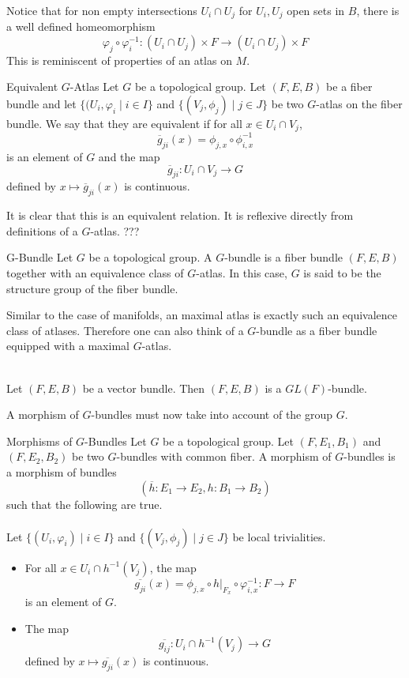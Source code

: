 \documentclass[a4paper]{article}
\begin{document}
Notice that for non empty intersections $U_i\cap U_j$ for $U_i,U_j$ open sets in $B$, there is a well defined homeomorphism $$\varphi_j\circ\varphi_i^{-1}:(U_i\cap U_j)\times F\to(U_i\cap U_j)\times F$$ This is reminiscent of properties of an atlas on $M$. \\

\begin{defn}{Equivalent $G$-Atlas}{} Let $G$ be a topological group. Let $(F,E,B)$ be a fiber bundle and let $\{(U_i,\varphi_i\;|\;i\in I\}$ and $\{(V_j,\phi_j)\;|\;j\in J\}$ be two $G$-atlas on the fiber bundle. We say that they are equivalent if for all $x\in U_i\cap V_j$, $$\overline{g}_{ji}(x)=\phi_{j,x}\circ\phi_{i,x}^{-1}$$ is an element of $G$ and the map $$\overline{g}_{ji}:U_i\cap V_j\to G$$ defined by $x\mapsto\overline{g}_{ji}(x)$ is continuous. 
\end{defn}

It is clear that this is an equivalent relation. It is reflexive directly from definitions of a $G$-atlas. ???

\begin{defn}{G-Bundle}{} Let $G$ be a topological group. A $G$-bundle is a fiber bundle $(F,E,B)$ together with an equivalence class of $G$-atlas. In this case, $G$ is said to be the structure group of the fiber bundle. 
\end{defn}

Similar to the case of manifolds, an maximal atlas is exactly such an equivalence class of atlases. Therefore one can also think of a $G$-bundle as a fiber bundle equipped with a maximal $G$-atlas. 

\begin{eg}{}{}\\
Let $(F,E,B)$ be a vector bundle. Then $(F,E,B)$ is a $GL(F)$-bundle. 
\end{eg}

A morphism of $G$-bundles must now take into account of the group $G$. 

\begin{defn}{Morphisms of $G$-Bundles}{} Let $G$ be a topological group. Let $(F,E_1,B_1)$ and $(F,E_2,B_2)$ be two $G$-bundles with common fiber. A morphism of $G$-bundles is a morphism of bundles $$(\overline{h}:E_1\to E_2,h:B_1\to B_2)$$ such that the following are true. \\~\\

Let $\{(U_i,\varphi_i)\;|\;i\in I\}$ and $\{(V_j,\phi_j)\;|\;j\in J\}$ be local trivialities. 
\begin{itemize}
\item For all $x\in U_i\cap h^{-1}(V_j)$, the map $$\overline{g_{ji}}(x)=\phi_{j,x}\circ h|_{F_x}\circ\varphi_{i,x}^{-1}:F\to F$$ is an element of $G$. 
\item The map $$\overline{g_{ij}}:U_i\cap h^{-1}(V_j)\to G$$ defined by $x\mapsto\overline{g_{ji}}(x)$ is continuous. 
\end{itemize}
\end{defn}
\end{document}
